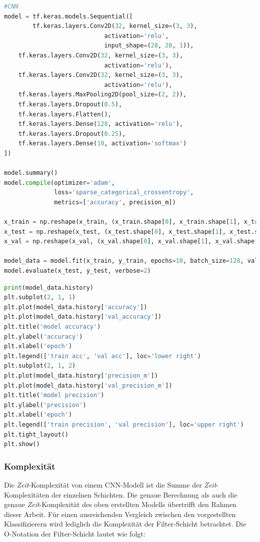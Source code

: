 \begin{minipage}{\textwidth}
    \begin{lstlisting}[language=Python, caption=Pythoncode zur Konstuktion vom CNN, label=lst:test_cnn]
#CNN
model = tf.keras.models.Sequential([
		tf.keras.layers.Conv2D(32, kernel_size=(3, 3),
							activation='relu',
							input_shape=(28, 28, 1)),
	tf.keras.layers.Conv2D(32, kernel_size=(3, 3),
							activation='relu'),
	tf.keras.layers.Conv2D(32, kernel_size=(3, 3),
							activation='relu'),
	tf.keras.layers.MaxPooling2D(pool_size=(2, 2)),
	tf.keras.layers.Dropout(0.5),
	tf.keras.layers.Flatten(),
	tf.keras.layers.Dense(128, activation='relu'),
	tf.keras.layers.Dropout(0.25),
	tf.keras.layers.Dense(10, activation='softmax')
])

model.summary()
model.compile(optimizer='adam',
              loss='sparse_categorical_crossentropy',
              metrics=['accuracy', precision_m])

x_train = np.reshape(x_train, (x_train.shape[0], x_train.shape[1], x_train.shape[2], 1))
x_test = np.reshape(x_test, (x_test.shape[0], x_test.shape[1], x_test.shape[2], 1))
x_val = np.reshape(x_val, (x_val.shape[0], x_val.shape[1], x_val.shape[2], 1))
				
model_data = model.fit(x_train, y_train, epochs=10, batch_size=128, validation_data=(x_val, y_val))
model.evaluate(x_test, y_test, verbose=2)
\end{lstlisting}
\end{minipage}

\begin{minipage}{\textwidth}
    \begin{lstlisting}[language=Python, caption=Pythoncode zum Darstellen der Daten, label=lst:test_plot_cnn]
print(model_data.history)
plt.subplot(2, 1, 1)
plt.plot(model_data.history['accuracy'])
plt.plot(model_data.history['val_accuracy'])
plt.title('model accuracy')
plt.ylabel('accuracy')
plt.xlabel('epoch')
plt.legend(['train acc', 'val acc'], loc='lower right')
plt.subplot(2, 1, 2)
plt.plot(model_data.history['precision_m'])
plt.plot(model_data.history['val_precision_m'])
plt.title('model precision')
plt.ylabel('precision')
plt.xlabel('epoch')
plt.legend(['train precision', 'val precision'], loc='upper right')
plt.tight_layout()
plt.show()
	\end{lstlisting}
\end{minipage}

\subsubsection{Komplexität}
Die \textit{Zeit}-Komplexität von einem CNN-Modell ist die Summe der \textit{Zeit}-Komplexitäten der einzelnen Schichten. Die genaue Berechnung als auch die genaue \textit{Zeit}-Komplexität des oben erstellten Modells übertrifft den Rahmen dieser Arbeit. Für einen ausreichenden Vergleich zwischen den vorgestellten Klassifizierern wird lediglich die Komplexität der Filter-Schicht betrachtet. Die O-Notation der Filter-Schicht lautet wie folgt:

